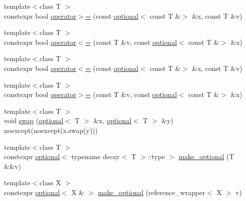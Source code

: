 \begin{DoxyCompactItemize}
\item 
{\footnotesize template$<$class T $>$ }\\constexpr bool \mbox{\hyperlink{namespacestd_1_1experimental_a43c159cf8ffd0e172adbac601809aacd}{operator$>$=}} (const \mbox{\hyperlink{classstd_1_1experimental_1_1optional}{optional}}$<$ const T \&$>$ \&x, const T \&v)
\item 
{\footnotesize template$<$class T $>$ }\\constexpr bool \mbox{\hyperlink{namespacestd_1_1experimental_aca22cd45974dad371a24b9618f2d1b33}{operator$<$=}} (const T \&v, const \mbox{\hyperlink{classstd_1_1experimental_1_1optional}{optional}}$<$ const T \&$>$ \&x)
\item 
{\footnotesize template$<$class T $>$ }\\constexpr bool \mbox{\hyperlink{namespacestd_1_1experimental_afb3a1b869e0a3eb4840f37edf61ba0ef}{operator$<$=}} (const \mbox{\hyperlink{classstd_1_1experimental_1_1optional}{optional}}$<$ const T \&$>$ \&x, const T \&v)
\item 
{\footnotesize template$<$class T $>$ }\\constexpr bool \mbox{\hyperlink{namespacestd_1_1experimental_a943314dada174c65a0ac853cbdc89989}{operator$>$=}} (const T \&v, const \mbox{\hyperlink{classstd_1_1experimental_1_1optional}{optional}}$<$ const T \&$>$ \&x)
\item 
{\footnotesize template$<$class T $>$ }\\void \mbox{\hyperlink{namespacestd_1_1experimental_acdfba2d2e9c79f689a34c9cea5c5682d}{swap}} (\mbox{\hyperlink{classstd_1_1experimental_1_1optional}{optional}}$<$ T $>$ \&x, \mbox{\hyperlink{classstd_1_1experimental_1_1optional}{optional}}$<$ T $>$ \&y) noexcept(noexcept(x.\+swap(y)))
\item 
{\footnotesize template$<$class T $>$ }\\constexpr \mbox{\hyperlink{classstd_1_1experimental_1_1optional}{optional}}$<$ typename decay$<$ T $>$\+::type $>$ \mbox{\hyperlink{namespacestd_1_1experimental_aa6c8db3625ec5a8e7f6288fb5adf8f95}{make\+\_\+optional}} (T \&\&v)
\item 
{\footnotesize template$<$class X $>$ }\\constexpr \mbox{\hyperlink{classstd_1_1experimental_1_1optional}{optional}}$<$ X \& $>$ \mbox{\hyperlink{namespacestd_1_1experimental_a0f7b286ddf3bb6c4e95580898dcde37b}{make\+\_\+optional}} (reference\+\_\+wrapper$<$ X $>$ v)
\end{DoxyCompactItemize}
